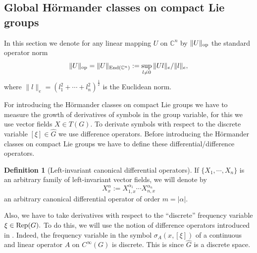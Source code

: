 \documentclass[12pt, reqno]{amsart}
\theoremstyle{definition}
\newtheorem{definition}[theorem]{Definition}
\theoremstyle{remark}
\numberwithin{equation}{section}
\begin{document}
\subsection{Global H\"ormander classes on compact Lie groups} In this section we denote for any linear mapping $U$ on $\mathbb{C}^n$ by $\Vert U\Vert_{\textnormal{op}}$ the standard operator norm
$$ \Vert U\Vert_{\textnormal{op}}= \Vert U\Vert_{\textnormal{End}(\mathbb{C}^n)}:=\sup_{l\neq 0}\|Ul\|_{e}/\|l\|_{e} , $$ where $\|l\|_{e}=(l_1^2+\cdots +l_n^2)^{\frac{1}{2}} $ is the Euclidean norm.

For introducing the H\"ormander classes on compact Lie groups we have to measure the growth of derivatives of symbols in the group variable, for this we use vector fields $X\in T(G).$ To derivate symbols with respect to the discrete variable $[\xi]\in \widehat{G}$ we use difference operators. Before introducing the H\"ormander classes on compact Lie groups we have to define these differential/difference operators. 

\begin{definition}[Left-invariant canonical differential operators] If $\{X_{1},\cdots, X_{n}\}$ is an arbitrary family of left-invariant vector fields, we will denote by
$$  X_{x}^{\alpha}:=X_{1,x}^{\alpha_1}\cdots X_{n,x}^{\alpha_n} $$
an arbitrary canonical differential operator of order $m=|\alpha|.$    
\end{definition}

 
Also, we have to take derivatives with respect to the ``discrete'' frequency variable $\xi\in \textnormal{Rep}(G).$ To do this, we will use the notion of difference operators introduced in \cite{RuzhanskyWirth2015}. Indeed,  the frequency variable in the symbol $\sigma_A(x,[\xi])$ of a continuous and linear operator $A$ on $C^\infty(G)$ is discrete. This is since $\widehat{G}$ is a discrete space.
\end{document}
